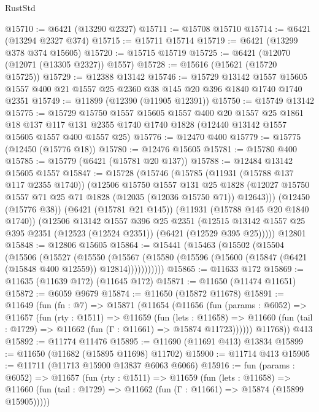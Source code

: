 \begin{lexlean}{RustStd}
\begin{coremodule}
@15710 := @6421 (@13290 @2327)
@15711 := @15708 @15710
@15714 := @6421 (@13294 @2327 @374)
@15715 := @15711 @15714
@15719 := @6421 (@13299 @378 @374 @15605)
@15720 := @15715 @15719
@15725 := @6421 (@12070 (@12071 (@13305 @2327)) @1557)
@15728 := @15616 (@15621 (@15720 @15725))
@15729 := @12388 @13142
@15746 := @15729
    @13142
    @1557
    @15605
    @1557
    @400
    @21
    @1557
    @25
    @2360
    @38
    @145
    @20
    @396
    @1840
    @1740
    @1740
    @2351
@15749 := @11899 (@12390 (@11905 @12391))
@15750 := @15749 @13142
@15775 := @15729
    @15750
    @1557
    @15605
    @1557
    @400
    @20
    @1557
    @25
    @1861
    @18
    @137
    @117
    @131
    @2355
    @1740
    @1740
    @1828
    (@12440 @13142 @1557 @15605 @1557 @400 @1557 @25)
@15776 := @12470 @400
@15779 := @15775 (@12450 (@15776 @18))
@15780 := @12476 @15605
@15781 := @15780 @400
@15785 := @15779 (@6421 (@15781 @20 @137))
@15788 := @12484 @13142 @15605 @1557
@15847 := @15728
    (@15746
      (@15785
        (@11931 (@15788 @137 @117 @2355 @1740))
        (@12506
          @15750
          @1557
          @131
          @25
          @1828
          (@12027 @15750 @1557 @71 @25 @71 @1828 (@12035 (@12036 @15750 @71)) @12643)))
      (@12450 (@15776 @38))
      (@6421 (@15781 @21 @145))
      (@11931 (@15788 @145 @20 @1840 @1740))
      (@12506
        @13142
        @1557
        @396
        @25
        @2351
        (@12515 @13142 @1557 @25 @395 @2351 (@12523 (@12524 @2351)) (@6421 (@12529 @395 @25)))))
    @12801
@15848 := @12806 @15605
@15864 := @15441
    (@15463
      (@15502
        (@15504
          (@15506
            (@15527
              (@15550
                (@15567
                  (@15580 (@15596 (@15600 (@15847 (@6421 (@15848 @400 @12559)) @12814)))))))))))
@15865 := @11633 @172
@15869 := @11635 (@11639 @172) (@11645 @172)
@15871 := @11650 (@11474 @11651)
@15872 := @6059 @9679
@15874 := @11650 (@15872 @11678)
@15891 := @11649
    (fun (fn : @7) =>
    @15871
      (@11654
        (@11656
          (fun (params : @6052) =>
          @11657
            (fun (rty : @1511) =>
            @11659
              (fun (lets : @11658) =>
              @11660 (fun (tail : @1729) => @11662 (fun (Γ : @11661) => @15874 @11723))))))
        @11768))
    @413
@15892 := @11774 @11476
@15895 := @11690 (@11691 @413) @13834
@15899 := @11650 (@11682 (@15895 @11698) @11702)
@15900 := @11714 @413
@15905 := @11711 (@11713 @15900 @13837 @6063 @6066)
@15916 := fun (params : @6052) =>
  @11657
    (fun (rty : @1511) =>
    @11659
      (fun (lets : @11658) =>
      @11660 (fun (tail : @1729) => @11662 (fun (Γ : @11661) => @15874 (@15899 @15905)))))

\end{coremodule}
\end{lexlean}
